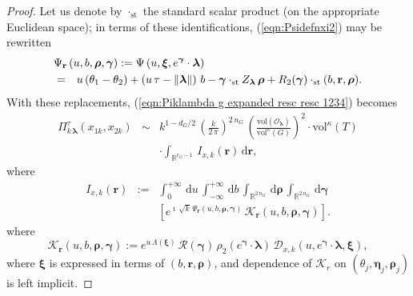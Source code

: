 \documentclass[12pt,a4paper]{article}
\theoremstyle{plain}
\theoremstyle{definition}
\begin{document}
\begin{proof}
Let us denote by $\cdot_{\mathrm{st}}$ the standard 
scalar product (on the appropriate Euclidean space);
in terms of these identifications, (\ref{eqn:Psidefnxi2})
may be rewritten
\begin{eqnarray}
\label{eqn:Psidefnxi23}
\lefteqn{\Psi_{\mathbf{r}}
\left(u,b,\boldsymbol{\rho},
\boldsymbol{\gamma} \right):=\Psi
\left(u,\boldsymbol{\xi},e^{\boldsymbol{\gamma}}\cdot \boldsymbol{\lambda}\right)
}\\
&=&u\,(\theta_1-\theta_2)+\left(u\,\tau
-\|\boldsymbol{\lambda}\|\right)\,b
-\boldsymbol{\gamma}\cdot_{\mathrm{st}}
Z_{\boldsymbol{\lambda}} \,\boldsymbol{\rho}
+
R_2(\boldsymbol{\gamma})\cdot_{\mathrm{st}}
(b,\mathbf{r},\boldsymbol{\rho}).\nonumber
\end{eqnarray}
With these replacements,
(\ref{eqn:Piklambda g expanded resc resc 1234}) becomes
\begin{eqnarray}
\label{eqn:Piklambda g expanded resc resc-12345}
\Pi^\tau_{k\,\boldsymbol{\lambda}}(x_{1k},x_{2k})
&\sim&
%
k^{1-d_G/2}\,
\left(\frac{k}{2\,\pi}\right)^{2\,n_G}\,
\left(\frac{\mathrm{vol}(\mathcal{O}_{\boldsymbol{\lambda}})}{\mathrm{vol}^\kappa (G)}\right)^2\cdot 
\mathrm{vol}^\kappa
(T)
\nonumber\\
&&\cdot \int_{\mathbb{R}^{r_G-1}}\,
I_{x,k}(\mathbf{r})\,\mathrm{d}\mathbf{r}
,
\end{eqnarray}
where 
\begin{eqnarray}
\label{eqn:defn di Ikr}
I_{x,k}(\mathbf{r})
&:=& \int_0^{+\infty}\,\mathrm{d}u
\,\int_{-\infty}^{+\infty}\,\mathrm{d}b
\,\int_{\mathbb{R}^{2\,n_G}}\,\mathrm{d}\boldsymbol{\rho}
\,\int_{\mathbb{R}^{2\,n_G}}\,
%
\mathrm{d}\boldsymbol{\gamma}
\nonumber\\
&&
\left[
 e^{\imath\,\sqrt{k}\,
\Psi_{\mathbf{r}}
\left(u,b,\boldsymbol{\rho},
\boldsymbol{\gamma} \right)}\,
\mathcal{K}_{\mathbf{r}}\left(u,b,\boldsymbol{\rho},
\boldsymbol{\gamma} \right)\right].
\end{eqnarray}
where 
$$
\mathcal{K}_{\mathbf{r}}\left(u,b,\boldsymbol{\rho},
\boldsymbol{\gamma} \right)
:=e^{u\,\Lambda (\boldsymbol{\xi})}\,\mathcal{R}(\boldsymbol{\gamma})\,
\rho_2(e^{\boldsymbol{\gamma}}\cdot \boldsymbol{\lambda})\,
\mathcal{D}_{x,k}\left(u,e^{\boldsymbol{\gamma}}\cdot \boldsymbol{\lambda},\boldsymbol{\xi}\right),
$$
where $\boldsymbol{\xi}$ is expressed in terms of 
$(b,\mathbf{r},\boldsymbol{\rho})$, and dependence of
$\mathcal{K}_r$ on $(\theta_j,\boldsymbol{\eta}_j,\boldsymbol{\rho}_j)$
is left implicit.



\end{proof}
\end{document}

